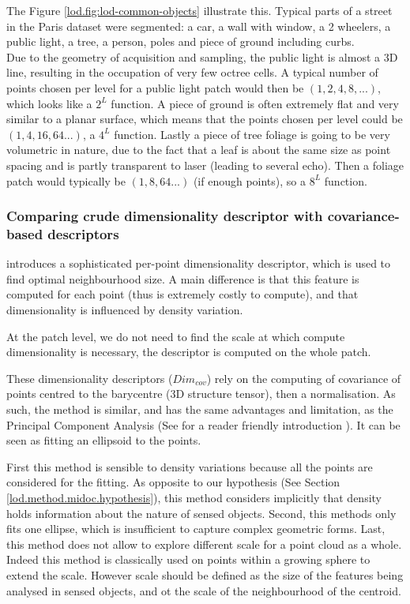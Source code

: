		The Figure \ref{lod.fig:lod-common-objects} illustrate this. Typical parts of a street in the Paris dataset were segmented: a car, a wall with window, a 2 wheelers, a public light, a tree, a person, poles and piece of ground including curbs.
		\\
		Due to the geometry of acquisition and sampling, the public light is almost a 3D line, resulting in the occupation of very few octree cells.
		A typical number of points chosen per level for a public light patch would then be $(1,2,4,8,...)$, which looks like a $2^L$ function.
		A piece of ground is often extremely flat and very similar to a planar surface,
		which means that the points chosen per level could be $(1,4,16,64...)$, a $4^L$ function.
		Lastly a piece of tree foliage is going to be very volumetric in nature,
		due to the fact that a leaf is about the same size as point spacing and is partly transparent to laser (leading to several echo).
		Then a foliage patch would typically be $(1,8,64...)$ (if enough points), so a $8^L$ function.
		 
				
		\subsubsection{Comparing crude dimensionality descriptor with covariance-based descriptors}
		
		\cite{Demantke2014, Weinmann2015} introduces a sophisticated per-point dimensionality descriptor, which is used to find optimal neighbourhood size. A main difference is that this feature is computed for each point (thus is extremely costly to compute), and that dimensionality is influenced by density variation.
			 
		At the patch level, we do not need to find the scale at which compute dimensionality is necessary,
		the descriptor is computed on the whole patch.
		
		
		These dimensionality descriptors ($Dim_{cov}$) rely on the computing of covariance of points centred to the barycentre (3D structure tensor), then a normalisation.
		As such, the method is similar, and has the same advantages and limitation, as the Principal Component Analysis (See \cite{Shlens2014} for a reader friendly introduction ).
		It can be seen as fitting an ellipsoid to the points.
		
		First this method is sensible to density variations because all the points are considered for the fitting. 
		As opposite to our hypothesis (See Section \ref{lod.method.midoc.hypothesis}),
		this method considers implicitly that density holds information about the nature of sensed objects. 
		Second, this methods only fits one ellipse, which is insufficient to capture complex geometric forms. 
		Last, this method does not allow to explore different scale for a point cloud as a whole. Indeed this method is classically used on points within a growing sphere to extend the scale. However scale should be defined as the size of the features being analysed in sensed objects, and ot the scale of the neighbourhood of the centroid.
		
